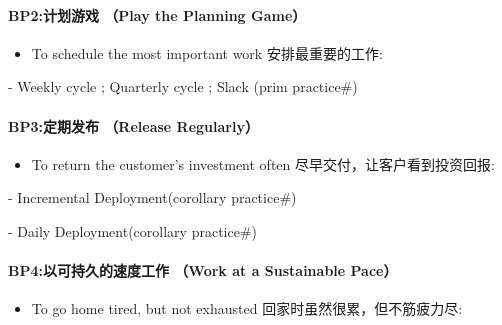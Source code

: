 \hypertarget{bp2ux8ba1ux5212ux6e38ux620f-play-the-planning-game}{%
\paragraph{BP2:计划游戏 （Play the Planning
Game）}\label{bp2ux8ba1ux5212ux6e38ux620f-play-the-planning-game}}

\begin{itemize}
\tightlist
\item
  To schedule the most important work 安排最重要的工作:\\
\end{itemize}

\begin{description}
\tightlist
\item[]
- Weekly cycle ; Quarterly cycle ; Slack (prim practice\#)
\end{description}

\hypertarget{bp3ux5b9aux671fux53d1ux5e03-release-regularly}{%
\paragraph{BP3:定期发布 （Release
Regularly）}\label{bp3ux5b9aux671fux53d1ux5e03-release-regularly}}

\begin{itemize}
\tightlist
\item
  To return the customer's investment often
  尽早交付，让客户看到投资回报:
\end{itemize}

\begin{description}
\tightlist
\item[]
- Incremental Deployment(corollary practice\#)

- Daily Deployment(corollary practice\#)
\end{description}

\hypertarget{bp4ux4ee5ux53efux6301ux4e45ux7684ux901fux5ea6ux5de5ux4f5c-work-at-a-sustainable-pace}{%
\paragraph{BP4:以可持久的速度工作 （Work at a Sustainable
Pace）}\label{bp4ux4ee5ux53efux6301ux4e45ux7684ux901fux5ea6ux5de5ux4f5c-work-at-a-sustainable-pace}}

\begin{itemize}
\tightlist
\item
  To go home tired, but not exhausted 回家时虽然很累，但不筋疲力尽:\\
\end{itemize}

